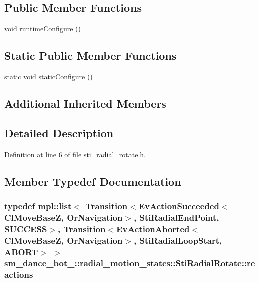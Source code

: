 \subsection*{Public Member Functions}
\begin{DoxyCompactItemize}
\item 
void \hyperlink{structsm__dance__bot__3_1_1radial__motion__states_1_1StiRadialRotate_ad27cd200d820c9f3ac4ddfa74b3228f5}{runtime\+Configure} ()
\end{DoxyCompactItemize}
\subsection*{Static Public Member Functions}
\begin{DoxyCompactItemize}
\item 
static void \hyperlink{structsm__dance__bot__3_1_1radial__motion__states_1_1StiRadialRotate_a1bb791d0acbd54904af57afb35101532}{static\+Configure} ()
\end{DoxyCompactItemize}
\subsection*{Additional Inherited Members}


\subsection{Detailed Description}


Definition at line 6 of file sti\+\_\+radial\+\_\+rotate.\+h.



\subsection{Member Typedef Documentation}
\subsubsection[{\texorpdfstring{reactions}{reactions}}]{\setlength{\rightskip}{0pt plus 5cm}typedef mpl\+::list$<$ Transition$<$Ev\+Action\+Succeeded$<${\bf Cl\+Move\+BaseZ}, {\bf Or\+Navigation}$>$, {\bf Sti\+Radial\+End\+Point}, {\bf S\+U\+C\+C\+E\+SS}$>$, Transition$<$Ev\+Action\+Aborted$<${\bf Cl\+Move\+BaseZ}, {\bf Or\+Navigation}$>$, {\bf Sti\+Radial\+Loop\+Start}, A\+B\+O\+RT$>$ $>$ {\bf sm\+\_\+dance\+\_\+bot\+\_\+::radial\+\_\+motion\+\_\+states\+::\+Sti\+Radial\+Rotate\+::reactions}}\hypertarget{structsm__dance__bot__3_1_1radial__motion__states_1_1StiRadialRotate_a557d96f2bd2ac0f6cac096bf6da2cd30}{}\label{structsm__dance__bot__3_1_1radial__motion__states_1_1StiRadialRotate_a557d96f2bd2ac0f6cac096bf6da2cd30}


